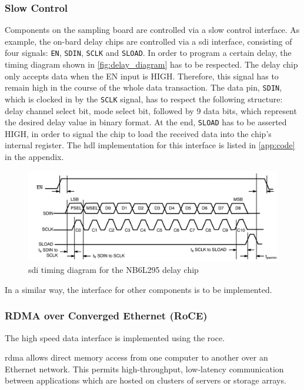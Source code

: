 \subsubsection*{Slow Control}
Components on the sampling board are controlled via a slow control interface. 
As example, the on-bard delay chips are controlled via a \gls{sdi} interface, consisting of four signals: \texttt{EN}, \texttt{SDIN}, \texttt{SCLK} and \texttt{SLOAD}. 
In order to program a certain delay, the timing diagram shown in \autoref{fig:delay_diagram} has to be respected.
The delay chip only accepts data when the EN input is HIGH. 
Therefore, this signal has to remain high in the course of the whole data transaction. 
The data pin, \texttt{SDIN}, which is clocked in by the \texttt{SCLK} signal, has to respect the following structure: delay channel select bit, mode select bit, followed by 9 data bits, which represent the desired delay value in binary format.
At the end, \texttt{SLOAD} has to be asserted HIGH, in order to signal the chip to load the received data into the chip's internal register.
The \gls{hdl} implementation for this interface is listed in \autoref{app:code} in the appendix. 

\begin{figure}[tb]
	\centering
	\includegraphics[width = \textwidth]{chap/05-readout/img/sdi_interface_delay}
	\caption{\gls{sdi} timing diagram for the NB6L295 delay chip \cite{NB6L295}}
	\label{fig:delay_diagram}
\end{figure}

In a similar way, the interface for other components is to be implemented.

\subsubsection*{RDMA over Converged Ethernet (RoCE)}
The high speed data interface is implemented using the \gls{roce}.

\Gls{rdma} allows direct memory access from one computer to another over an Ethernet network. This permits high-throughput, low-latency communication between applications which are hosted on clusters of servers or storage arrays. 

